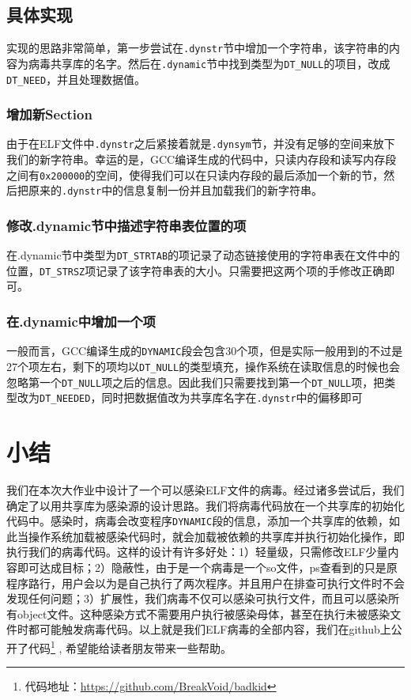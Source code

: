 \documentclass[a4paper, 11pt]{article}
\begin{document}
\subsection{具体实现}
实现的思路非常简单，第一步尝试在\texttt{.dynstr}节中增加一个字符串，该字符串的内容为病毒共享库的名字。然后在\texttt{.dynamic}节中找到类型为\texttt{DT\_NULL}的项目，改成\texttt{DT\_NEED}，并且处理数据值。
\subsubsection{增加新Section}
由于在ELF文件中\texttt{.dynstr}之后紧接着就是\texttt{.dynsym}节，并没有足够的空间来放下我们的新字符串。幸运的是，GCC编译生成的代码中，只读内存段和读写内存段之间有\texttt{0x200000}的空间，使得我们可以在只读内存段的最后添加一个新的节，然后把原来的\texttt{.dynstr}中的信息复制一份并且加载我们的新字符串。
\subsubsection{修改.dynamic节中描述字符串表位置的项}
在.dynamic节中类型为\texttt{DT\_STRTAB}的项记录了动态链接使用的字符串表在文件中的位置，\texttt{DT\_STRSZ}项记录了该字符串表的大小。只需要把这两个项的手修改正确即可。
\subsubsection{在.dynamic中增加一个项}
一般而言，GCC编译生成的\texttt{DYNAMIC}段会包含30个项，但是实际一般用到的不过是27个项左右，剩下的项均以\texttt{DT\_NULL}的类型填充，操作系统在读取信息的时候也会忽略第一个\texttt{DT\_NULL}项之后的信息。因此我们只需要找到第一个\texttt{DT\_NULL}项，把类型改为\texttt{DT\_NEEDED}，同时把数据值改为共享库名字在\texttt{.dynstr}中的偏移即可
\section{小结}
	我们在本次大作业中设计了一个可以感染ELF文件的病毒。经过诸多尝试后，我们确定了以用共享库为感染源的设计思路。我们将病毒代码放在一个共享库的初始化代码中。感染时，病毒会改变程序\texttt{DYNAMIC}段的信息，添加一个共享库的依赖，如此当操作系统加载被感染代码时，就会加载被依赖的共享库并执行初始化操作，即执行我们的病毒代码。这样的设计有许多好处：1）轻量级，只需修改ELF少量内容即可达成目标；2）隐蔽性，由于是一个病毒是一个so文件，ps查看到的只是原程序路行，用户会以为是自己执行了两次程序。并且用户在排查可执行文件时不会发现任何问题；3）扩展性，我们病毒不仅可以感染可执行文件，而且可以感染所有object文件。这种感染方式不需要用户执行被感染母体，甚至在执行未被感染文件时都可能触发病毒代码。以上就是我们ELF病毒的全部内容，我们在github上公开了代码\footnote{代码地址：\url{https://github.com/BreakVoid/badkid}} , 希望能给读者朋友带来一些帮助。
\end{document}
